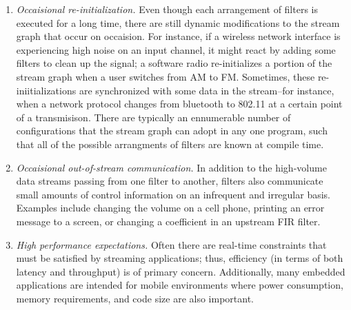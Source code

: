 \begin{enumerate}
\item {\it Occaisional re-initialization.}  Even though each
arrangement of filters is executed for a long time, there are still
dynamic modifications to the stream graph that occur on occaision.
For instance, if a wireless network interface is experiencing high
noise on an input channel, it might react by adding some filters to
clean up the signal; a software radio re-initializes a portion of the
stream graph when a user switches from AM to FM.  Sometimes, these
re-iniitializations are synchronized with some data in the stream--for
instance, when a network protocol changes from bluetooth to 802.11 at
a certain point of a transmisison.  There are typically an ennumerable
number of configurations that the stream graph can adopt in any one
program, such that all of the possible arrangments of filters are
known at compile time.

\item {\it Occaisional out-of-stream communication.}  In addition to
the high-volume data streams passing from one filter to another,
filters also communicate small amounts of control information on an
infrequent and irregular basis.  Examples include changing the volume
on a cell phone, printing an error message to a screen, or changing a
coefficient in an upstream FIR filter.

\item {\it High performance expectations.}  Often there are real-time
constraints that must be satisfied by streaming applications; thus,
efficiency (in terms of both latency and throughput) is of primary
concern.  Additionally, many embedded applications are intended for
mobile environments where power consumption, memory requirements, and
code size are also important.

\end{enumerate}



 





